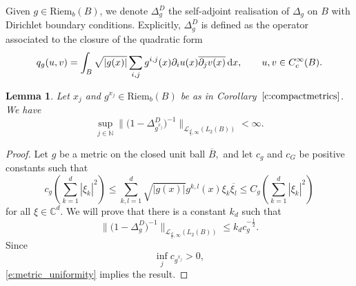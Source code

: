 \documentclass[pdftex]{sigma}
\numberwithin{equation}{section}
\newtheorem{Lemma}[Theorem]{Lemma}
\begin{document}
Given $g \in \mathrm{Riem}_b(B)$, we denote $\Delta_g^D$ the self-adjoint realisation of $\Delta_g$ on $B$ with Dirichlet boundary conditions. Explicitly, $\Delta_g^D$ is defined as the operator associated to the closure of the quadratic form
\[
 q_g(u,v) = \int_{B} \sqrt{|g(x)|}\sum_{i,j} g^{i,j}(x)\partial_i u(x)\overline{ \partial_j v(x)}\,{\rm d}x,\qquad u,v\in C^\infty_c(B).
\]
\begin{Lemma}\label{l:uniformlaplacianbound}
Let $x_j$ and $g^{x_j} \in \mathrm{Riem}_b(B)$ be as in Corollary~$\ref{c:compactmetrics}$.
We have
\[
\sup_{j \in \mathbb{N}} \bigl\|\bigl(1-\Delta_{g^{x_j}}^D\bigr)^{-1}\bigr\|_{\mathcal{L}_{\frac{d}{2},\infty}(L_2(B)) }<\infty.
\]
\end{Lemma}
\begin{proof}
Let $g$ be a metric on the closed unit ball $\overline{B},$ and let $c_g$ and $c_G$ be positive constants such that
\[
 c_g\left(\sum_{k=1}^d |\xi_k|^2\right) \leq \sum_{k,l=1}^d \sqrt{|g(x)|}g^{k,l}(x)\xi_k\overline{\xi_l} \leq C_g\left(\sum_{k=1}^d |\xi_k|^2\right)
\]
for all $\xi \in \mathbb{C}^d.$
We will prove that there is a constant $k_d$ such that
\begin{equation}\label{e:metric_uniformity}
\big\|\bigl(1-\Delta_{g}^D\bigr)^{-1}\big\|_{\mathcal{L}_{\frac{d}{2},\infty}(L_2(B)) } \leq k_dc_g^{-\frac12}.
\end{equation}
Since
\[
 \inf_{j} c_{g^{x_j}} > 0,
\]
\eqref{e:metric_uniformity} implies the result.


\end{proof}
\end{document}
